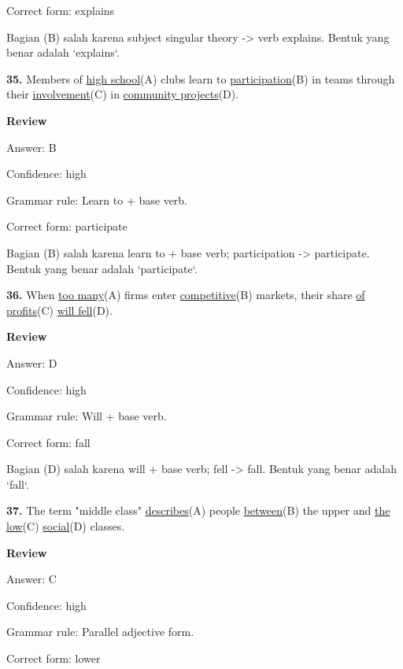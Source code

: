 \documentclass[12pt]{article}
\begin{document}
Correct form: explains\par
Bagian (B) salah karena subject singular theory -> verb explains. Bentuk yang benar adalah `explains`.\par
\endgroup
\par
\vspace{\questionblockgap}
\noindent\textbf{35.} Members of \uline{high school}(A) clubs learn to \uline{participation}(B) in teams through their \uline{involvement}(C) in \uline{community projects}(D).
\par
\begingroup
\setlength{\parskip}{0pt}
\setlength{\parindent}{0pt}
\textbf{Review}\par
Answer: B\par
Confidence: high\par
Grammar rule: Learn to + base verb.\par
Correct form: participate\par
Bagian (B) salah karena learn to + base verb; participation -> participate. Bentuk yang benar adalah `participate`.\par
\endgroup
\par
\vspace{\questionblockgap}
\noindent\textbf{36.} When \uline{too many}(A) firms enter \uline{competitive}(B) markets, their share \uline{of profits}(C) \uline{will fell}(D).
\par
\begingroup
\setlength{\parskip}{0pt}
\setlength{\parindent}{0pt}
\textbf{Review}\par
Answer: D\par
Confidence: high\par
Grammar rule: Will + base verb.\par
Correct form: fall\par
Bagian (D) salah karena will + base verb; fell -> fall. Bentuk yang benar adalah `fall`.\par
\endgroup
\par
\vspace{\questionblockgap}
\noindent\textbf{37.} The term "middle class" \uline{describes}(A) people \uline{between}(B) the upper and \uline{the low}(C) \uline{social}(D) classes.
\par
\begingroup
\setlength{\parskip}{0pt}
\setlength{\parindent}{0pt}
\textbf{Review}\par
Answer: C\par
Confidence: high\par
Grammar rule: Parallel adjective form.\par
Correct form: lower\par
\end{document}
